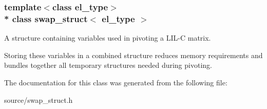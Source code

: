 \subsubsection*{template$<$class el\+\_\+type$>$\\*
class swap\+\_\+struct$<$ el\+\_\+type $>$}

A structure containing variables used in pivoting a L\+I\+L-\/C matrix. 

Storing these variables in a combined structure reduces memory requirements and bundles together all temporary structures needed during pivoting. 

The documentation for this class was generated from the following file\+:\begin{DoxyCompactItemize}
\item 
source/swap\+\_\+struct.\+h\end{DoxyCompactItemize}

